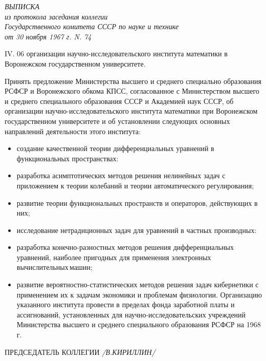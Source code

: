 \begin{center}
{\it ВЫПИСКА\\
из протокола заседания коллегии\\
Государственного комитета СССР по науке и технике\\
от 30 ноября 1967 г. N. 74}
\end{center}

IV. 06 организации научно-исследовательского института математики в Воронежском государственном университете.

Принять предложение Министерства высшего и среднего специально образования РСФСР и Воронежского обкома КПСС, согласованное с Министерством высшего и среднего специального образования СССР и Академией наук СССР, об организации научно-исследовательского института математики при Воронежском государственном университете и об установлении следующих основных направлений деятельности этого института:
\begin{itemize}
\item создание качественной теории дифференциальных \linebreak уравнений в функциональных пространствах:

\item разработка асимптотических методов решения нелинейных задач с приложением к теории колебаний и теории автоматического регулирования;

\item развитие теории функциональных пространств и операторов, действующих в них;

\item исследование нетрадиционных задач для уравнений в \linebreak частных производных:

\item разработка конечно-разностных методов решения \linebreak дифференциальных уравнений, наиболее пригод\-ных
\linebreak для применения электронных\,вычислительных\,машин;

\item развитие вероятностно-статистических методов решения задач кибернетики с применением их к задачам экономики и проблемам физиологии.
Организацию \linebreak указанного института провести в пределах фонда заработной платы и ассигнований, установленных для научно-исследовательских учреждений Министерства высшего и среднего специального образования РСФСР на
1968 г.
\end{itemize}
ПРЕДСЕДАТЕЛЬ КОЛЛЕГИИ\;\;\; 	{\it /В.КИРИЛЛИН/}\\

